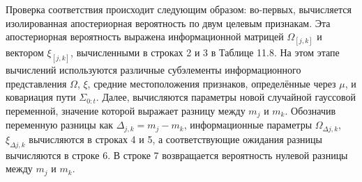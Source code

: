 \documentclass[10pt,a4paper]{article}
\begin{document}
Проверка соответствия происходит следующим образом: во-первых, вычисляется изолированная апостериорная вероятность по двум целевым признакам. Эта апостериорная вероятность выражена информационной матрицей $\varOmega_{[j,k]}$ и вектором $\xi_{[j,k]}$, вычисленными в строках 2 и 3 в Таблице 11.8. На этом этапе вычислений используются различные субэлементы информационного представления $\varOmega$, $\xi$, средние местоположения признаков, определённые через $\mu$, и ковариация пути $\varSigma_{0:t}$. Далее, вычисляются параметры новой случайной гауссовой переменной, значение которой выражает разницу между $m_j$ и $m_k$. Обозначив переменную разницы как $\varDelta_{j,k}=m_j-m_k$, информационные параметры $\varOmega_{\varDelta j,k}$, $\xi_{\varDelta j,k}$ вычисляются в строках 4 и 5, а соответствующие ожидания разницы вычисляются в строке 6. В строке 7 возвращается вероятность нулевой разницы между $m_j$ и $m_k$.
\end{document}
